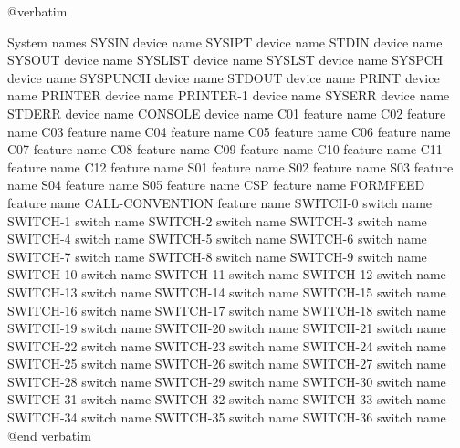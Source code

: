 @verbatim

System names
SYSIN                           device name
SYSIPT                          device name
STDIN                           device name
SYSOUT                          device name
SYSLIST                         device name
SYSLST                          device name
SYSPCH                          device name
SYSPUNCH                        device name
STDOUT                          device name
PRINT                           device name
PRINTER                         device name
PRINTER-1                       device name
SYSERR                          device name
STDERR                          device name
CONSOLE                         device name
C01                             feature name
C02                             feature name
C03                             feature name
C04                             feature name
C05                             feature name
C06                             feature name
C07                             feature name
C08                             feature name
C09                             feature name
C10                             feature name
C11                             feature name
C12                             feature name
S01                             feature name
S02                             feature name
S03                             feature name
S04                             feature name
S05                             feature name
CSP                             feature name
FORMFEED                        feature name
CALL-CONVENTION                 feature name
SWITCH-0                        switch name
SWITCH-1                        switch name
SWITCH-2                        switch name
SWITCH-3                        switch name
SWITCH-4                        switch name
SWITCH-5                        switch name
SWITCH-6                        switch name
SWITCH-7                        switch name
SWITCH-8                        switch name
SWITCH-9                        switch name
SWITCH-10                       switch name
SWITCH-11                       switch name
SWITCH-12                       switch name
SWITCH-13                       switch name
SWITCH-14                       switch name
SWITCH-15                       switch name
SWITCH-16                       switch name
SWITCH-17                       switch name
SWITCH-18                       switch name
SWITCH-19                       switch name
SWITCH-20                       switch name
SWITCH-21                       switch name
SWITCH-22                       switch name
SWITCH-23                       switch name
SWITCH-24                       switch name
SWITCH-25                       switch name
SWITCH-26                       switch name
SWITCH-27                       switch name
SWITCH-28                       switch name
SWITCH-29                       switch name
SWITCH-30                       switch name
SWITCH-31                       switch name
SWITCH-32                       switch name
SWITCH-33                       switch name
SWITCH-34                       switch name
SWITCH-35                       switch name
SWITCH-36                       switch name
@end verbatim
